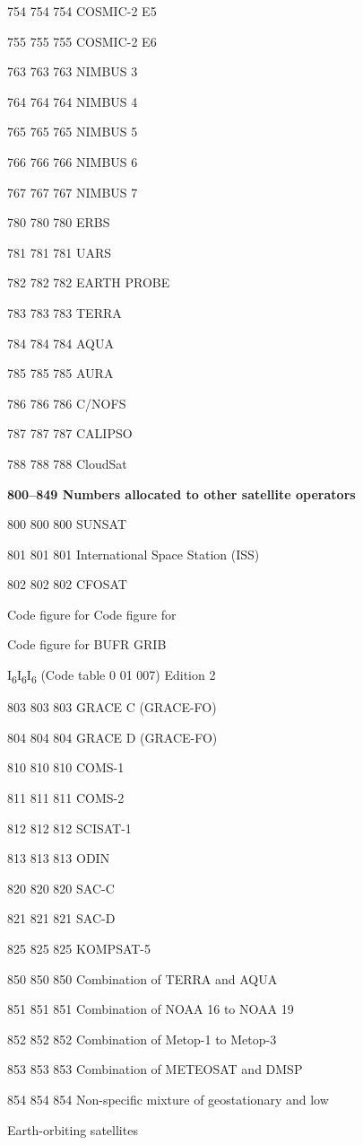 754 754 754 COSMIC-2 E5

755 755 755 COSMIC-2 E6

763 763 763 NIMBUS 3

764 764 764 NIMBUS 4

765 765 765 NIMBUS 5

766 766 766 NIMBUS 6

767 767 767 NIMBUS 7

780 780 780 ERBS

781 781 781 UARS

782 782 782 EARTH PROBE

783 783 783 TERRA

784 784 784 AQUA

785 785 785 AURA

786 786 786 C/NOFS

787 787 787 CALIPSO

788 788 788 CloudSat

\textbf{800--849 Numbers allocated to other satellite operators}

800 800 800 SUNSAT

801 801 801 International Space Station (ISS)

802 802 802 CFOSAT

Code figure for Code figure for

Code figure for BUFR GRIB

I\textsubscript{6}I\textsubscript{6}I\textsubscript{6} (Code table 0 01 007) Edition 2

803 803 803 GRACE C (GRACE-FO)

804 804 804 GRACE D (GRACE-FO)

810 810 810 COMS-1

811 811 811 COMS-2

812 812 812 SCISAT-1

813 813 813 ODIN

820 820 820 SAC-C

821 821 821 SAC-D

825 825 825 KOMPSAT-5

850 850 850 Combination of TERRA and AQUA

851 851 851 Combination of NOAA 16 to NOAA 19

852 852 852 Combination of Metop-1 to Metop-3

853 853 853 Combination of METEOSAT and DMSP

854 854 854 Non-specific mixture of geostationary and low

Earth-orbiting satellites

